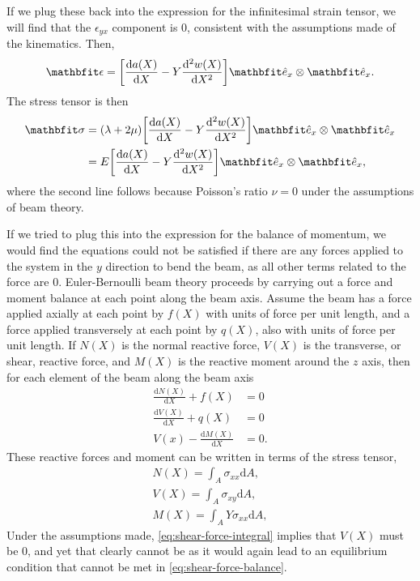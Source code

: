 If we plug these back into the expression for the infinitesimal strain tensor, we will find that the $\epsilon_{yx}$ component is 0, consistent with the assumptions made of the kinematics.
Then,
\begin{equation}
    \vec{\epsilon} = \mleft[ \frac{\mathrm{d} a(X)}{\mathrm{d} X} - Y \frac{\mathrm{d}^{2} w(X)}{\mathrm{d} X^{2}} \mright]\unitvec_{x} \otimes \unitvec_{x}.
\end{equation}
The stress tensor is then
\begin{align}
    \vec{\sigma} &= (\lambda + 2 \mu) \mleft[ \frac{\mathrm{d} a(X)}{\mathrm{d} X} - Y \frac{\mathrm{d}^{2} w(X)}{\mathrm{d} X^{2}} \mright]\unitvec_{x} \otimes \unitvec_{x} \nonumber\\
                 &= E \mleft[ \frac{\mathrm{d} a(X)}{\mathrm{d} X} - Y \frac{\mathrm{d}^{2} w(X)}{\mathrm{d} X^{2}} \mright]\unitvec_{x} \otimes \unitvec_{x},
\end{align}
where the second line follows because Poisson's ratio $\nu = 0$ under the assumptions of beam theory.

If we tried to plug this into the expression for the balance of momentum, we would find the equations could not be satisfied if there are any forces applied to the system in the $y$ direction to bend the beam, as all other terms related to the force are 0.
Euler-Bernoulli beam theory proceeds by carrying out a force and moment balance at each point along the beam axis.
Assume the beam has a force applied axially at each point by $f(X)$ with units of force per unit length, and a force applied transversely at each point by $q(X)$, also with units of force per unit length.
If $N(X)$ is the normal reactive force, $V(X)$ is the transverse, or shear, reactive force, and $M(X)$ is the reactive moment around the $z$ axis, then for each element of the beam along the beam axis
\begin{align}
    \frac{\mathrm{d} N(X)}{\mathrm{d} X} + f(X) &= 0 \label{eq:normal-force-balance}\\
    \frac{\mathrm{d} V(X)}{\mathrm{d} X} + q(X) &= 0 \label{eq:shear-force-balance}\\
    V(x) - \frac{\mathrm{d} M(X)}{\mathrm{d} X} &= 0. \label{eq:moment-balance}
\end{align}
These reactive forces and moment can be written in terms of the stress tensor,
\begin{align}
    N(X) = \int_{A} \sigma_{xx} \mathrm{d} A, \label{eq:normal-force-integral}\\
    V(X) = \int_{A} \sigma_{xy} \mathrm{d} A, \label{eq:shear-force-integral}\\
    M(X) = \int_{A} Y \sigma_{xx} \mathrm{d} A, \label{eq:moment-integral}
\end{align}
Under the assumptions made, \cref{eq:shear-force-integral} implies that $V(X)$ must be 0, and yet that clearly cannot be as it would again lead to an equilibrium condition that cannot be met in \cref{eq:shear-force-balance}.

